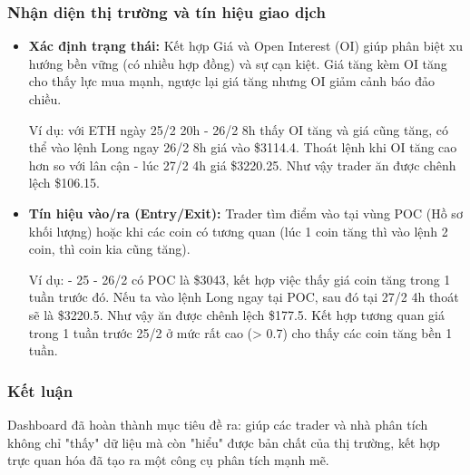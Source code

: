 \subsubsection{Nhận diện thị trường và tín hiệu giao dịch}
\begin{itemize}
    \item \textbf{Xác định trạng thái:} Kết hợp Giá và Open Interest (OI) giúp phân biệt xu hướng bền vững (có nhiều hợp đồng) và sự cạn kiệt. Giá tăng kèm OI tăng cho thấy lực mua mạnh, ngược lại giá tăng nhưng OI giảm cảnh báo đảo chiều. 
    
        Ví dụ: với ETH ngày 25/2 20h - 26/2 8h thấy OI tăng và giá cũng tăng, có thể vào lệnh Long ngay 26/2 8h giá vào \$3114.4. Thoát lệnh khi OI tăng cao hơn so với lân cận - lúc 27/2 4h giá \$3220.25. Như vậy trader ăn được chênh lệch \$106.15.
    \item \textbf{Tín hiệu vào/ra (Entry/Exit):} Trader tìm điểm vào tại vùng POC (Hồ sơ khối lượng) hoặc khi các coin có tương quan (lúc 1 coin tăng thì vào lệnh 2 coin, thì coin kia cũng tăng). 

        Ví dụ: 
        - 25 - 26/2 có POC là \$3043, kết hợp việc thấy giá coin tăng trong 1 tuần trước đó. Nếu ta vào lệnh Long ngay tại POC, sau đó tại 27/2 4h thoát sẽ là \$3220.5. Như vậy ăn được chênh lệch \$177.5. Kết hợp tương quan giá trong 1 tuần trước 25/2 ở mức rất cao (> 0.7) cho thấy các coin tăng bền 1 tuần.
\end{itemize}

\subsubsection{Kết luận}
Dashboard đã hoàn thành mục tiêu đề ra: giúp các trader và nhà phân tích không chỉ "thấy" dữ liệu mà còn "hiểu" được bản chất của thị trường, kết hợp trực quan hóa đã tạo ra một công cụ phân tích mạnh mẽ.